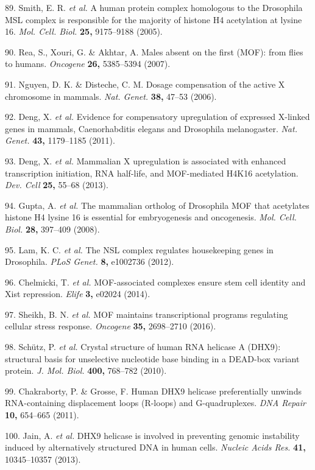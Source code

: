 \documentclass[11pt,twoside]{MPIthesis}
\theoremstyle{definition}
\theoremstyle{definition}
\theoremstyle{definition}
\theoremstyle{remark}
\begin{document}
89. Smith, E. R. \emph{et al.} A human protein complex homologous to the
Drosophila MSL complex is responsible for the majority of histone H4
acetylation at lysine 16. \emph{Mol. Cell. Biol.} \textbf{25,}
9175--9188 (2005).

90. Rea, S., Xouri, G. \& Akhtar, A. Males absent on the first (MOF):
from flies to humans. \emph{Oncogene} \textbf{26,} 5385--5394 (2007).

91. Nguyen, D. K. \& Disteche, C. M. Dosage compensation of the active X
chromosome in mammals. \emph{Nat. Genet.} \textbf{38,} 47--53 (2006).

92. Deng, X. \emph{et al.} Evidence for compensatory upregulation of
expressed X-linked genes in mammals, Caenorhabditis elegans and
Drosophila melanogaster. \emph{Nat. Genet.} \textbf{43,} 1179--1185
(2011).

93. Deng, X. \emph{et al.} Mammalian X upregulation is associated with
enhanced transcription initiation, RNA half-life, and MOF-mediated H4K16
acetylation. \emph{Dev. Cell} \textbf{25,} 55--68 (2013).

94. Gupta, A. \emph{et al.} The mammalian ortholog of Drosophila MOF
that acetylates histone H4 lysine 16 is essential for embryogenesis and
oncogenesis. \emph{Mol. Cell. Biol.} \textbf{28,} 397--409 (2008).

95. Lam, K. C. \emph{et al.} The NSL complex regulates housekeeping
genes in Drosophila. \emph{PLoS Genet.} \textbf{8,} e1002736 (2012).

96. Chelmicki, T. \emph{et al.} MOF-associated complexes ensure stem
cell identity and Xist repression. \emph{Elife} \textbf{3,} e02024
(2014).

97. Sheikh, B. N. \emph{et al.} MOF maintains transcriptional programs
regulating cellular stress response. \emph{Oncogene} \textbf{35,}
2698--2710 (2016).

98. Schütz, P. \emph{et al.} Crystal structure of human RNA helicase A
(DHX9): structural basis for unselective nucleotide base binding in a
DEAD-box variant protein. \emph{J. Mol. Biol.} \textbf{400,} 768--782
(2010).

99. Chakraborty, P. \& Grosse, F. Human DHX9 helicase preferentially
unwinds RNA-containing displacement loops (R-loops) and G-quadruplexes.
\emph{DNA Repair} \textbf{10,} 654--665 (2011).

100. Jain, A. \emph{et al.} DHX9 helicase is involved in preventing
genomic instability induced by alternatively structured DNA in human
cells. \emph{Nucleic Acids Res.} \textbf{41,} 10345--10357 (2013).
\end{document}
